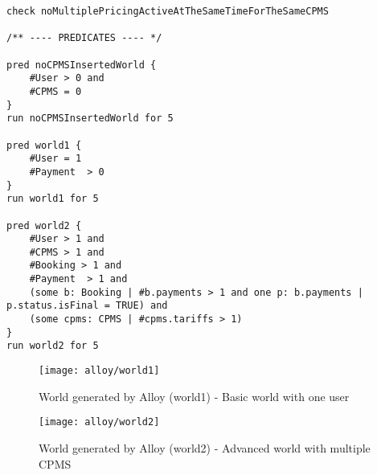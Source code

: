 \begin{lstlisting}
check noMultiplePricingActiveAtTheSameTimeForTheSameCPMS

/** ---- PREDICATES ---- */

pred noCPMSInsertedWorld {
	#User > 0 and
	#CPMS = 0
}
run noCPMSInsertedWorld for 5

pred world1 {
	#User = 1
	#Payment  > 0
}
run world1 for 5

pred world2 {
	#User > 1 and
	#CPMS > 1 and
	#Booking > 1 and
	#Payment  > 1 and
	(some b: Booking | #b.payments > 1 and one p: b.payments | p.status.isFinal = TRUE) and
	(some cpms: CPMS | #cpms.tariffs > 1)
}
run world2 for 5
\end{lstlisting}


\begin{figure}[h]
\centering
\texttt{[image: alloy/world1]}
\caption{World generated by Alloy (world1) - Basic world with one user}
\end{figure}

\begin{figure}[h]
\centering
\texttt{[image: alloy/world2]}
\caption{World generated by Alloy (world2) - Advanced world with multiple CPMS}
\end{figure}















